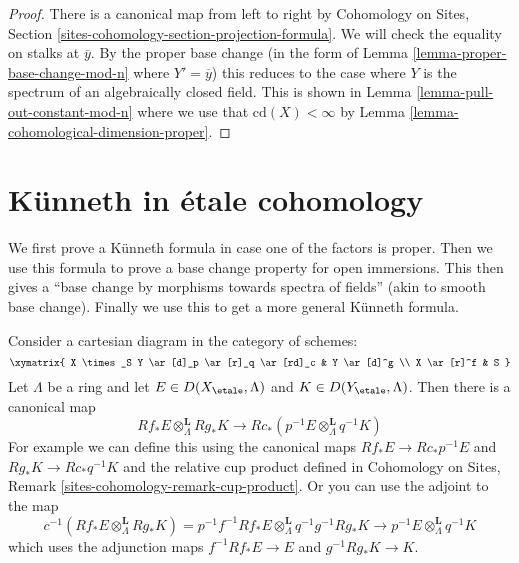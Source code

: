 \begin{proof}
There is a canonical map from left to right by
Cohomology on Sites, Section \ref{sites-cohomology-section-projection-formula}.
We will check the equality on stalks at $\overline{y}$.
By the proper base change (in the form of
Lemma \ref{lemma-proper-base-change-mod-n} where $Y' = \overline{y}$)
this reduces to the case where $Y$ is the spectrum of
an algebraically closed field.
This is shown in Lemma \ref{lemma-pull-out-constant-mod-n}
where we use that $\text{cd}(X) < \infty$ by
Lemma \ref{lemma-cohomological-dimension-proper}.
\end{proof}






\section{K\"unneth in \'etale cohomology}
\label{section-kunneth}

\noindent
We first prove a K\"unneth formula in case one of the factors
is proper. Then we use this formula to prove a base change property
for open immersions. This then gives a
``base change by morphisms towards spectra of fields''
(akin to smooth base change).
Finally we use this to get a more general K\"unneth formula.

\begin{remark}
\label{remark-define-kunneth-map}
Consider a cartesian diagram in the category of schemes:
$$
\xymatrix{
X \times_S Y \ar[d]_p \ar[r]_q \ar[rd]_c & Y \ar[d]^g \\
X \ar[r]^f & S
}
$$
Let $\Lambda$ be a ring and let $E \in D(X_\etale, \Lambda)$
and $K \in D(Y_\etale, \Lambda)$. Then there is a canonical map
$$
Rf_*E \otimes_\Lambda^\mathbf{L} Rg_*K
\longrightarrow
Rc_*(p^{-1}E \otimes_\Lambda^\mathbf{L} q^{-1}K)
$$
For example we can define this using the canonical maps
$Rf_*E \to Rc_*p^{-1}E$ and $Rg_*K \to Rc_*q^{-1}K$ and
the relative cup product defined in Cohomology on Sites,
Remark \ref{sites-cohomology-remark-cup-product}.
Or you can use the adjoint to the map
$$
c^{-1}(Rf_*E \otimes_\Lambda^\mathbf{L} Rg_*K)
=
p^{-1}f^{-1}Rf_*E \otimes_\Lambda^\mathbf{L} q^{-1} g^{-1}Rg_*K
\to
p^{-1}E \otimes_\Lambda^\mathbf{L} q^{-1}K
$$
which uses the adjunction maps $f^{-1}Rf_*E \to E$ and
$g^{-1}Rg_*K \to K$.
\end{remark}


